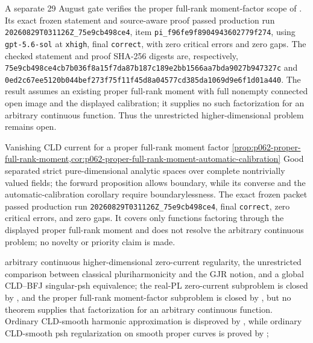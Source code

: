 
A separate 29 August gate verifies the proper full-rank moment-factor scope
of .  Its exact frozen statement and
source-aware proof passed production run
\nolinkurl{20260829T031126Z_75e9cb498ce4}, item
\nolinkurl{pi_f96fe9f8904943602779f274}, using
\texttt{gpt-5.6-sol} at \texttt{xhigh}, final \texttt{correct}, with zero
critical errors and zero gaps.  The checked statement and proof SHA-256
digests are, respectively,
\nolinkurl{75e9cb498ce4cb7b036f8a15f7da87b187c189e2bb1566aa7bda9027b947327c}
and
\nolinkurl{0ed2c67ee5120b044bef273f75f11f45d8a04577cd385da1069d9e6f1d01a440}.
The result assumes an existing proper full-rank moment with full nonempty
connected open image and the displayed calibration; it supplies no such factorization
for an arbitrary continuous function.  Thus the unrestricted
higher-dimensional problem remains open.

\AppLProvenanceRecord
  {Vanishing CLD current for a proper full-rank moment factor}
  {\cref{prop:p062-proper-full-rank-moment,cor:p062-proper-full-rank-moment-automatic-calibration}}
  {Good separated strict pure-dimensional analytic spaces over complete
   nontrivially valued fields; the forward proposition allows boundary, while
   its converse and the automatic-calibration corollary require
   boundarylessness.  The exact frozen packet passed production run
   \nolinkurl{20260829T031126Z_75e9cb498ce4}, final \texttt{correct}, zero
   critical errors, and zero gaps.  It covers only functions factoring
   through the displayed proper full-rank moment and does not resolve the
   arbitrary continuous problem; no novelty or priority claim is made.}

\item arbitrary continuous higher-dimensional zero-current regularity, the
  unrestricted comparison between classical pluriharmonicity and the GJR
  notion, and a global CLD--BFJ singular-psh equivalence; the real-PL
  zero-current subproblem is closed by
  , and the proper full-rank
  moment-factor subproblem is closed by
  , but no theorem supplies that
  factorization for an arbitrary continuous function.  Ordinary CLD-smooth
  harmonic approximation is disproved by
  , while ordinary
  CLD-smooth psh regularization on smooth proper curves is proved by
  ;
